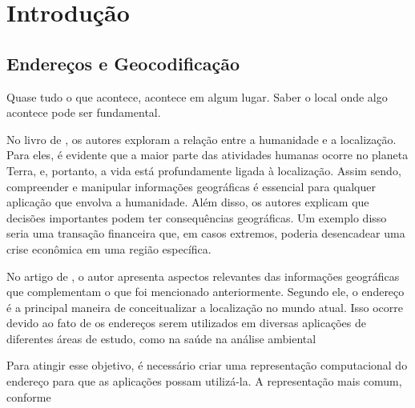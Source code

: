 \chapter{Introdução} \label{Introducao}

\section{Endereços e Geocodificação}
 
\epigraph{Quase tudo o que acontece, acontece em algum lugar. Saber o local onde algo acontece pode ser fundamental.}{\cite{longley2013}}

No livro de \cite{longley2013}, os autores exploram a relação entre a humanidade e a localização. Para eles, é evidente que a maior parte das atividades humanas ocorre no planeta Terra, e, portanto, a vida está profundamente ligada à localização. Assim sendo, compreender e manipular informações geográficas é essencial para qualquer aplicação que envolva a humanidade. Além disso, os autores explicam que decisões importantes podem ter consequências geográficas. Um exemplo disso seria uma transação financeira que, em casos extremos, poderia desencadear uma crise econômica em uma região específica.

No artigo de \cite{Zamberg2009}, o autor apresenta aspectos relevantes das informações geográficas que complementam o que foi mencionado anteriormente. Segundo ele, o endereço é a principal maneira de conceitualizar a localização no mundo atual. Isso ocorre devido ao fato de os endereços serem utilizados em diversas aplicações de diferentes áreas de estudo, como na saúde %
na análise ambiental %

Para atingir esse objetivo, é necessário criar uma representação computacional do endereço para que as aplicações possam utilizá-la. A representação mais comum, conforme %

